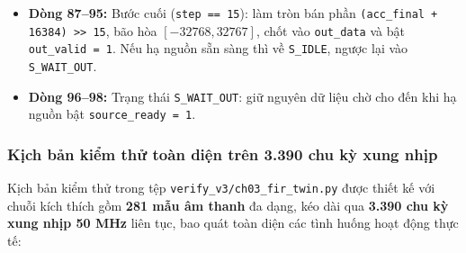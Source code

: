 \begin{itemize}[leftmargin=1.5em, itemsep=2pt]
    \item \textbf{Dòng 87--95:} Bước cuối (\texttt{step == 15}): làm tròn bán phần \texttt{(acc\_final + 16384) >> 15}, bão hòa $[-32768, 32767]$, chốt vào \texttt{out\_data} và bật \texttt{out\_valid = 1}. Nếu hạ nguồn sẵn sàng thì về \texttt{S\_IDLE}, ngược lại vào \texttt{S\_WAIT\_OUT}.
    \item \textbf{Dòng 96--98:} Trạng thái \texttt{S\_WAIT\_OUT}: giữ nguyên dữ liệu chờ cho đến khi hạ nguồn bật \texttt{source\_ready = 1}.
\end{itemize}

\subsubsection*{Kịch bản kiểm thử toàn diện trên 3.390 chu kỳ xung nhịp}
Kịch bản kiểm thử trong tệp \texttt{verify\_v3/ch03\_fir\_twin.py} được thiết kế với chuỗi kích thích gồm \textbf{281 mẫu âm thanh} đa dạng, kéo dài qua \textbf{3.390 chu kỳ xung nhịp 50 MHz} liên tục, bao quát toàn diện các tình huống hoạt động thực tế:

